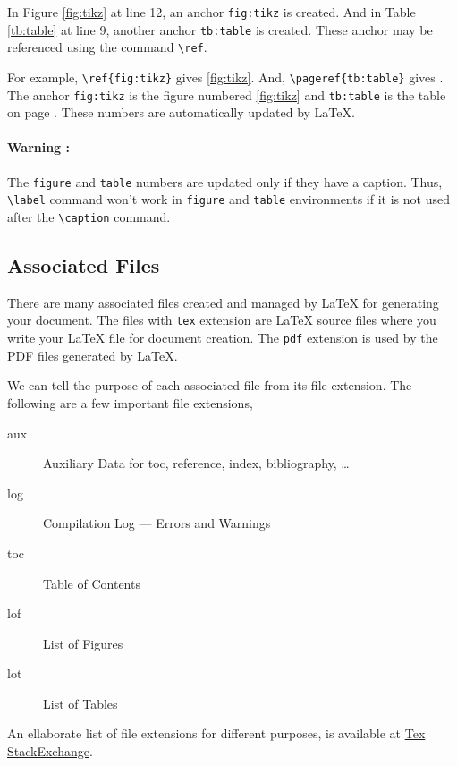 \documentclass{article}
\theoremstyle{definition}
\theoremstyle{remark}
\begin{document}
	In Figure \ref{fig:tikz} at line 12, an anchor \texttt{fig:tikz} is created. And in Table \ref{tb:table} at line 9, another anchor \texttt{tb:table} is created. These anchor may be referenced using the command \texttt{\textbackslash ref}. 
	
	For example, \texttt{\textbackslash ref\{fig:tikz\}} gives \ref{fig:tikz}. And, \texttt{\textbackslash pageref\{tb:table\}} gives \pageref{tb:table}. The anchor \texttt{fig:tikz} is the figure numbered \ref{fig:tikz} and \texttt{tb:table} is the table on page \pageref{tb:table}. These numbers are automatically updated by \LaTeX{}.

\paragraph{Warning :}
	The \texttt{figure} and \texttt{table} numbers are updated only if they have a caption. Thus, \texttt{\textbackslash label} command won't work in \texttt{figure} and \texttt{table} environments if it is not used after the \texttt{\textbackslash caption} command.

\subsection{Associated Files}
	There are many associated files created and managed by \LaTeX{} for generating your document. The files with \texttt{tex} extension are \LaTeX{} source files where you write your \LaTeX{} file for document creation. The \texttt{pdf} extension is used by the PDF files generated by \LaTeX{}. 

	We can tell the purpose of each associated file from its file extension. The following are a few important file extensions,
\begin{description}
	\item[aux] Auxiliary Data for toc, reference, index, bibliography, \dots
	\item[log] Compilation Log --- Errors and Warnings
	\item[toc] Table of Contents
	\item[lof] List of Figures
	\item[lot] List of Tables
\end{description}

An ellaborate list of file extensions for different purposes, is available at \href{https://tex.stackexchange.com/questions/7770/file-extensions-related-to-latex-etc}{Tex StackExchange}.
\end{document}
